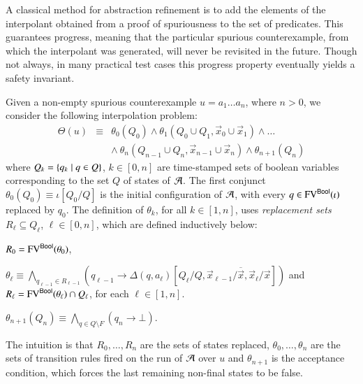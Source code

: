 \documentclass[10pt,conference,letterpaper,twocolumn]{IEEEtran}
\begin{document}

A classical method for abstraction refinement is to add the elements
of the interpolant obtained from a proof of spuriousness to the set of
predicates. This guarantees progress, meaning that the particular
spurious counterexample, from which the interpolant was generated,
will never be revisited in the future. Though not always, in many
practical test cases this progress property eventually yields a safety
invariant.

Given a non-empty spurious counterexample $u = a_1\ldots a_n$, where
$n>0$, we consider the following interpolation problem: 
\begin{eqnarray}\label{eq:interpolation-problem}
\Theta(u) & \equiv & \theta_0(Q_0) \wedge \theta_1(Q_0 \cup Q_1,\vec{x}_0
\cup \vec{x}_1) \wedge \ldots \\ 
&& \wedge~ \theta_n(Q_{n-1} \cup Q_n,\vec{x}_{n-1} \cup \vec{x}_n) \wedge \theta_{n+1}(Q_n) \nonumber
\end{eqnarray}
where $Q_k = \left\{ q_k \mid q \in Q \right\}$, $k \in [0,n]$ are time-stamped
sets of boolean variables corresponding to the set $Q$ of states of
$\mathcal{A}$. The first conjunct $\theta_0(Q_0) \equiv \iota[Q_0/Q]$ is the
initial configuration of $\mathcal{A}$, with every $q \in \mathrm{FV}^{\mathsf{Bool}}(\iota)$
replaced by $q_0$. The definition of $\theta_k$, for all $k\in[1,n]$,
uses \emph{replacement sets} $R_\ell \subseteq Q_\ell$, $\ell\in
[0,n]$, which are defined inductively below: \begin{compactitem}
\item $R_0 = \mathrm{FV}^{\mathsf{Bool}}(\theta_0)$,
%
\item $\theta_\ell \equiv \bigwedge_{q_{\ell-1}\in R_{\ell-1}}
  (q_{\ell-1} \rightarrow
  \Delta(q,a_\ell)[Q_\ell/Q,\vec{x}_{\ell-1}/\overline{\vec{x}},\vec{x}_\ell/\vec{x}])$
  and $R_\ell = \mathrm{FV}^{\mathsf{Bool}}(\theta_\ell) \cap Q_\ell$, for each
  $\ell\in[1,n]$.
%
\item $\theta_{n+1}(Q_n) \equiv \bigwedge_{q \in Q \setminus F} (q_n
  \rightarrow \bot)$.
\end{compactitem}
The intuition is that $R_0,\ldots,R_n$ are the sets of states
replaced, $\theta_0, \ldots, \theta_n$ are the sets of transition
rules fired on the run of $\mathcal{A}$ over $u$ and $\theta_{n+1}$ is the
acceptance condition, which forces the last remaining non-final states
to be false.
\end{document}
